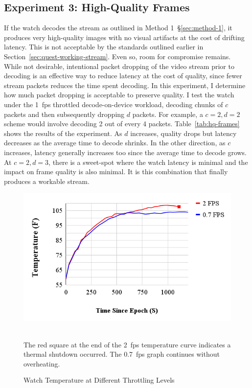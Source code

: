 \subsection{Experiment 3: High-Quality Frames}
If the watch decodes the stream as outlined in Method 1~\S\ref{sec:method-1}, it produces very high-quality images with no visual artifacts at the cost of drifting latency. This is not acceptable by the standards outlined earlier in Section~\ref{sec:quest-working-stream}. Even so, room for compromise remains. While not desirable, intentional packet dropping of the video stream prior to decoding is an effective way to reduce latency at the cost of quality, since fewer stream packets reduces the time spent decoding. In this experiment, I determine how much packet dropping is acceptable to preserve quality. I test the watch under the 1~fps throttled decode-on-device workload, decoding chunks of $c$ packets and then subsequently dropping $d$ packets. For example, a $c=2, d=2$ scheme would involve decoding 2 out of every 4 packets. Table~\ref{tab:hq-frames} shows the results of the experiment. As $d$ increases, quality drops but latency decreases as the average time to decode shrinks. In the other direction, as $c$ increases, latency generally increases too since the average time to decode grows. At $c=2, d=3$, there is a sweet-spot where the watch latency is minimal and the impact on frame quality is also minimal. It is this combination that finally produces a workable stream.

\begin{figure}
    \centering
    \includegraphics[width=0.8\linewidth]{chapter3/FIGS/temperature.png}
    \begin{captext}
    \\[0.1cm]
    \small The red square at the end of the 2~fps temperature curve indicates a thermal shutdown occurred. The 0.7~fps graph continues without overheating.
    \end{captext}
    \caption{Watch Temperature at Different Throttling Levels}
    \label{fig:temperature}
\end{figure}

